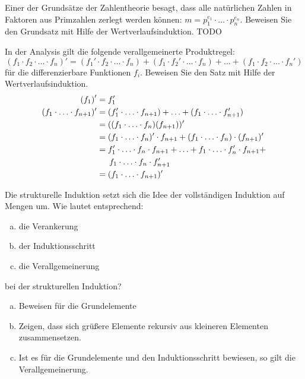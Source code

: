 \begin{card}
  Einer der Grundsätze der Zahlentheorie besagt, dass alle natürlichen Zahlen in Faktoren aus Primzahlen zerlegt werden
  können: $m = p_1^{e_1} \cdot \ldots \cdot p_n^{e_n}$. Beweisen Sie den Grundsatz mit Hilfe der Wertverlaufsinduktion.
  \hr
  TODO
\end{card}

\begin{card}
  In der Analysis gilt die folgende verallgemeinerte Produktregel:
  \[
  (f_1 \cdot f_2 \cdot \ldots \cdot f_n)' = (f_1' \cdot f_2 \cdot \ldots \cdot f_n) + (f_1 \cdot f_2' \cdot \ldots \cdot f_n) + \ldots + (f_1 \cdot f_2 \cdot \ldots \cdot f_n')
  \]
  für die differenzierbare Funktionen $f_i$. Beweisen Sie den Satz mit Hilfe der Wertverlaufsinduktion.
  \hr
  \begin{align*}
    \left( f_1 \right) ' &= f_1' \\
    (f_1 \cdot \ldots \cdot f_{n+1})' &= (f_1' \cdot \ldots \cdot f_{n+1}) + \ldots + (f_1 \cdot \ldots \cdot f_{n+1}') \\
    &= ((f_1 \cdot \ldots \cdot f_n)(f_{n+1}))' \\
    &= (f_1 \cdot \ldots \cdot f_n)' \cdot f_{n+1} + (f_1 \cdot \ldots \cdot f_n) \cdot (f_{n+1})' \\
    &= f_1' \cdot \ldots \cdot f_n \cdot f_{n+1} + \ldots + f_1 \cdot \ldots \cdot f_n' \cdot f_{n+1} + \\
    &\hspace{1.5em} f_1 \cdot \ldots \cdot f_n \cdot f_{n+1}' \\
    &= (f_1 \cdot \ldots \cdot f_{n+1})' \\
  \end{align*}
\end{card}

\begin{card}
	Die strukturelle Induktion setzt sich die Idee der vollständigen Induktion auf Mengen um. Wie lautet entsprechend:
  \begin{enumerate}[a)]
	  \item die Verankerung
	  \item der Induktionsschritt
	  \item die Verallgemeinerung
	\end{enumerate}
	bei der strukturellen Induktion?
	\hr
  \begin{enumerate}[a)]
	  \item Beweisen für die Grundelemente
	  \item Zeigen, dass sich grüßere Elemente rekursiv aus kleineren Elementen zusammensetzen.
	  \item Ist es für die Grundelemente und den Induktionsschritt bewiesen, so gilt die Verallgemeinerung.
	\end{enumerate}
\end{card}

